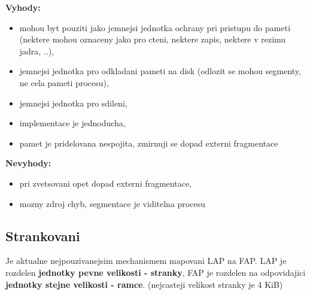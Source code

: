 \documentclass[a4paper, 11pt]{article}
\begin{document}
\textbf{Vyhody:}
\begin{itemize}
    \item mohou byt pouziti jako jemnejsi jednotka ochrany pri pristupu do pameti (nektere mohou oznaceny jako pro cteni, nektere zapis, nektere v rezimu jadra, ..),
    \item jemnejsi jednotka pro odkladani pameti na disk (odlozit se mohou segmenty, ne cela pameti procesu),
    \item jemnejsi jednotka pro sdileni,
    \item implementace je jednoducha,
    \item pamet je pridelovana nespojita, zmirnuji se dopad externi fragmentace \\
\end{itemize}

\textbf{Nevyhody:}
\begin{itemize}
    \item pri zvetsovani opet dopad externi fragmentace,
    \item mozny zdroj chyb, segmentace je viditelna procesu \\
\end{itemize}

\subsection{Strankovani}
Je aktualne nejpouzivanejsim mechanismem mapovani LAP na FAP. LAP je rozdelen \textbf{jednotky pevne velikosti - stranky}, FAP je rozdelen na odpovidajici \textbf{jednotky stejne velikosti - ramce}. (nejcasteji velikost stranky je 4 KiB)
\end{document}

